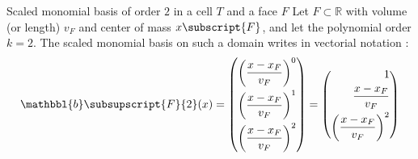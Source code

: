         \begin{exemplebox}{Scaled monomial basis of order $2$ in a cell $T$ and a face $F$}
            Let $F \subset \mathbb{R}$ with volume (or length) $v_F$ and center of mass ${x}\subscript{F}$, and let the polynomial order $k = 2$. The scaled monomial basis on such a domain writes in vectorial notation :
            \begin{equation}
                {\mathbbl{b}}\subsupscript{F}{2}(x) =
                \begin{pmatrix}
                    \begin{aligned}
                        \begin{pmatrix}
                            \displaystyle
                            \frac{x - x_F}{v_F}
                        \end{pmatrix}
                        ^0
                        \\
                        \begin{pmatrix}
                            \displaystyle
                            \frac{x - x_F}{v_F}
                        \end{pmatrix}
                        ^1
                        \\
                        \begin{pmatrix}
                            \displaystyle
                            \frac{x - x_F}{v_F}
                        \end{pmatrix}
                        ^2
                    \end{aligned}
                \end{pmatrix}
                =
                \begin{pmatrix}
                    \begin{aligned}
                        1
                        \\
                        \begin{matrix}
                            \displaystyle
                            \frac{x - x_F}{v_F}
                        \end{matrix}
                        \\
                        \begin{pmatrix}
                            \displaystyle
                            \frac{x - x_F}{v_F}
                        \end{pmatrix}
                        ^2
                    \end{aligned}

\end{pmatrix}
\end{equation}
\end{exemplebox}
